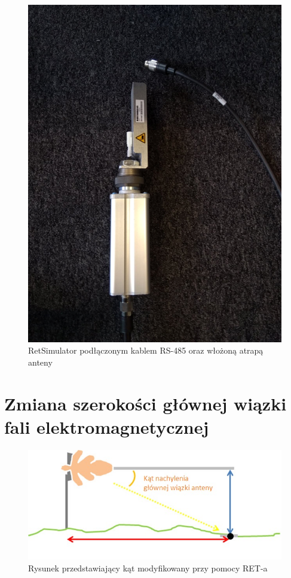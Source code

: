 		\begin{figure}[h!]
		\centering
		\includegraphics[scale=0.4]{Obrazki/RET_2.png}
		\caption{RetSimulator podłączonym kablem RS-485 oraz włożoną atrapą anteny}
		\end{figure}

	\section{Zmiana szerokości głównej wiązki fali elektromagnetycznej}
		\begin{figure}[h!]
		\centering
		\includegraphics[scale=1.0]{Obrazki/Angle.jpeg}
		\caption{Rysunek przedstawiający kąt modyfikowany przy pomocy RET-a}
		\end{figure}
		
